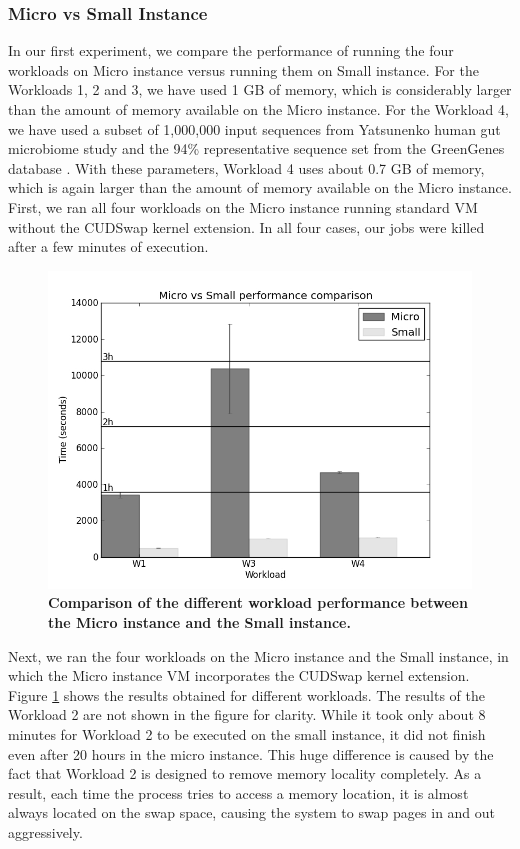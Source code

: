 \subsubsection{Micro vs Small Instance}
\label{micro-small}

In our first experiment, we compare the performance of running the four
workloads on Micro instance versus running them on Small
instance. For the Workloads 1, 2 and 3, we have used 1 GB of memory, which
is considerably larger than the amount of memory available on the Micro
instance. For the Workload 4, we have used a subset of 1,000,000 input
sequences from Yatsunenko human gut microbiome study \cite{Yatsunenko2012} and the
94\% representative sequence set from the GreenGenes database \cite{DeSantis2006}.
With these parameters, Workload 4 uses about 0.7 GB of memory, which is
again larger than the amount of memory available on the Micro instance.
First, we ran all four workloads on the Micro instance running standard VM
without the CUDSwap kernel extension. In all four cases, our jobs were
killed after a few minutes of execution.

\begin{figure}[htbp]
\includegraphics[width=\columnwidth]{chapter_cudswap_figures/micro_vs_small.jpg}
\caption[Comparison of the different workload performance between the Micro instance and the Small instance]{\textbf{Comparison of the different workload performance between the Micro instance and the Small instance.}}
\label{cudswapfigure2}
\end{figure}

Next, we ran the four workloads on the Micro instance and the Small instance,
in which the Micro instance VM incorporates the CUDSwap kernel extension. Figure
\ref{cudswapfigure2} shows the results obtained for different workloads.
The results of the Workload 2 are not shown in the figure for
clarity. While it took only about 8 minutes for Workload 2 to be executed
on the small
instance, it did not finish even after 20 hours in the micro instance.
This huge difference is caused by the fact that Workload 2 is designed
to remove memory locality completely. As a result,
each time the process tries to access a memory location, it is almost always
located
on the swap space, causing the system to swap pages in and out aggressively.

